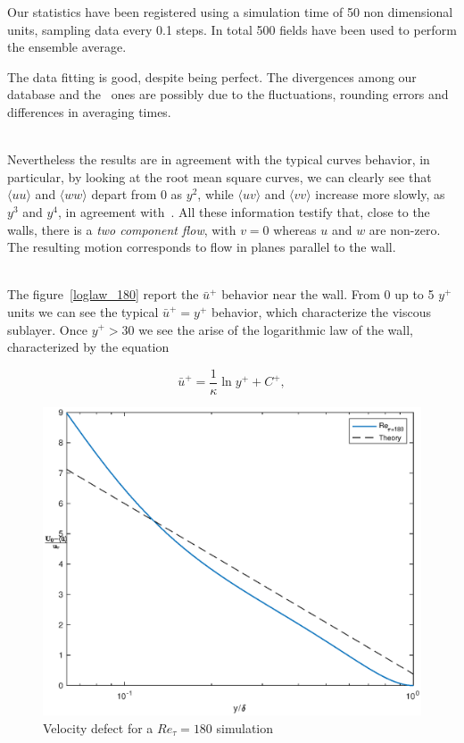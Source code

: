 Our statistics have been registered using a simulation time of 50 non dimensional units, sampling data every 0.1 steps.
In total 500 fields have been used to perform the ensemble average. \par

The data fitting is good, despite being perfect. The divergences among our database and the~\cite{kim_moin_moser} ones are possibly due to the fluctuations, rounding errors and differences in averaging times.\\~\par

Nevertheless the results are in agreement with the typical curves behavior, in particular, by looking at the root mean square curves, we can clearly see that $\langle uu\rangle$ and $\langle ww\rangle$ depart from 0 as $y^{2}$, while $\langle uv\rangle$ and $\langle vv\rangle$ increase more slowly, as $y^{3}$ and $y^{4}$, in agreement with~\cite[284]{pope}.
All these information testify that, close to the walls, there is a \emph{two component flow}, with $v=0$ whereas $u$ and $w$ are non-zero. The resulting motion corresponds to flow in planes parallel to the wall. \\~\par

The figure~\ref{loglaw_180} report the $\bar{u}^{+}$ behavior near the wall. From 0 up to 5 $y^{+}$ units we can see the typical $\bar{u}^{+}=y^{+}$ behavior, which characterize the viscous sublayer. Once $y^{+}>30$ we see the arise of the logarithmic law of the wall, characterized by the equation

\begin{equation*}
\bar{u}^{+} = \frac{1}{\kappa} \ln y^{+} +C^{+},
\end{equation*}


\begin{figure}
\begin{center}
\includegraphics[scale=0.55]{grafici/velocity_defect_180.eps}
\caption{Velocity defect for a $Re_{\tau}=180$ simulation}
\label{velocity:defect:180}
\end{center} 
\end{figure}

